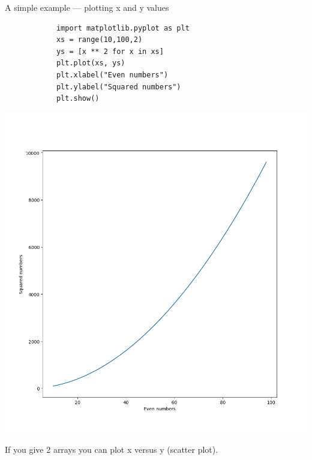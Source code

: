 \documentclass[aspectratio=169,handout]{beamer}
\begin{document}
\begin{frame}[fragile]{A simple example --- plotting x and y values}
    \begin{minipage}{0.49\textwidth}
        \begin{verbatim}
            import matplotlib.pyplot as plt
            xs = range(10,100,2)
            ys = [x ** 2 for x in xs]
            plt.plot(xs, ys)
            plt.xlabel("Even numbers")
            plt.ylabel("Squared numbers")
            plt.show()
        \end{verbatim}
    \end{minipage}
    \pause
    \begin{minipage}{0.49\textwidth}
        \centering
        \includegraphics[width=.8\textwidth]{./plots/plot2.png}
    \end{minipage}

    If you give 2 arrays you can plot x versus y (scatter plot).
\end{frame}
\end{document}
